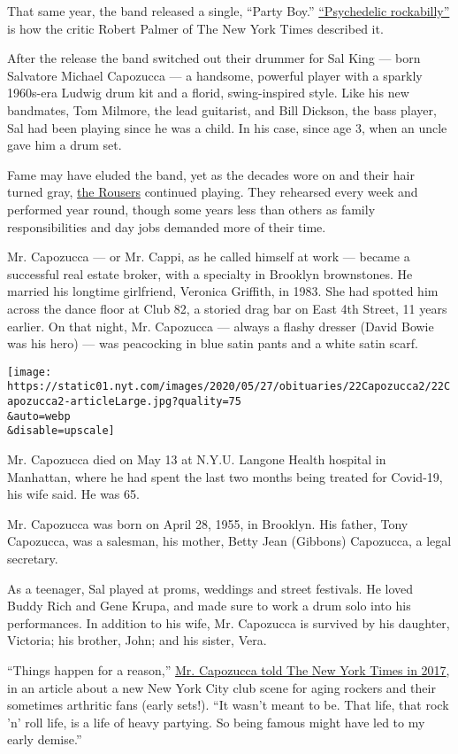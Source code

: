 That same year, the band released a single, ``Party Boy.''
\href{https://www.nytimes.com/1982/01/08/movies/new-faces-a-guide-to-fresh-talent-now-on-the-local-scene.html}{``Psychedelic
rockabilly''} is how the critic Robert Palmer of The New York Times
described it.

After the release the band switched out their drummer for Sal King ---
born Salvatore Michael Capozucca --- a handsome, powerful player with a
sparkly 1960s-era Ludwig drum kit and a florid, swing-inspired style.
Like his new bandmates, Tom Milmore, the lead guitarist, and Bill
Dickson, the bass player, Sal had been playing since he was a child. In
his case, since age 3, when an uncle gave him a drum set.

Fame may have eluded the band, yet as the decades wore on and their hair
turned gray, \href{https://www.facebook.com/TheRousersNYC/}{the Rousers}
continued playing. They rehearsed every week and performed year round,
though some years less than others as family responsibilities and day
jobs demanded more of their time.

Mr. Capozucca --- or Mr. Cappi, as he called himself at work --- became
a successful real estate broker, with a specialty in Brooklyn
brownstones. He married his longtime girlfriend, Veronica Griffith, in
1983. She had spotted him across the dance floor at Club 82, a storied
drag bar on East 4th Street, 11 years earlier. On that night, Mr.
Capozucca --- always a flashy dresser (David Bowie was his hero) --- was
peacocking in blue satin pants and a white satin scarf.

\texttt{[image: https://static01.nyt.com/images/2020/05/27/obituaries/22Capozucca2/22Capozucca2-articleLarge.jpg?quality=75\\\&auto=webp\\\&disable=upscale]}

Mr. Capozucca died on May 13 at N.Y.U. Langone Health hospital in
Manhattan, where he had spent the last two months being treated for
Covid-19, his wife said. He was 65.

Mr. Capozucca was born on April 28, 1955, in Brooklyn. His father, Tony
Capozucca, was a salesman, his mother, Betty Jean (Gibbons) Capozucca, a
legal secretary.

As a teenager, Sal played at proms, weddings and street festivals. He
loved Buddy Rich and Gene Krupa, and made sure to work a drum solo into
his performances. In addition to his wife, Mr. Capozucca is survived by
his daughter, Victoria; his brother, John; and his sister, Vera.

``Things happen for a reason,''
\href{https://www.nytimes.com/2017/11/24/nyregion/new-york-punk-out-of-retirement.html}{Mr.
Capozucca told The New York Times in 2017}, in an article about a new
New York City club scene for aging rockers and their sometimes arthritic
fans (early sets!). ``It wasn't meant to be. That life, that rock 'n'
roll life, is a life of heavy partying. So being famous might have led
to my early demise.''

